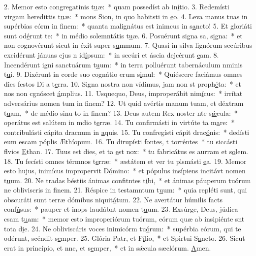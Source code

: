 2. Memor esto congregatinis t\uline{u}æ:~* quam possedíst ab in\uline{í}tio.
3. Redemísti virgam heredittis t\uline{u}æ:~* mons Sion, in quo habitsti in \uline{e}o.
4. Leva manus tuas in supérbias eórm in f\uline{i}nem:~* quanta malignátus est inimcus in s\uline{a}ncto!
5. Et gloriáti sunt  od\uline{é}runt te:~* in médio solemntátis t\uline{u}æ.
6. Posuérunt signa sa, s\uline{i}gna:~* et non cognovérunt sicut in éxit super s\uline{u}mmum.
7. Quasi in silva lignórum secúribus excidérunt jánuas ejus n id\uline{í}psum:~* in secúri et áscia dejcérunt \uline{e}am.
8. Incendérunt igni sanctuárum t\uline{u}um:~* in terra polluérunt tabernáculum nminis t\uline{u}i.
9. Dixérunt in corde suo cognátio erum s\uline{i}mul:~* Quiéscere faciámus omnes dies festos Di a t\uline{e}rra.
10. Signa nostra non vídimus, jam non st proph\uline{é}ta:~* et nos non cgnóscet \uline{á}mplius.
11. Usquequo, Deus, improperábit nim\uline{í}cus:~* irrítat adversárius nomen tum in f\uline{i}nem?
12. Ut quid avértis manum tuam, et déxtram t\uline{u}am,~* de médio sinu to in f\uline{i}nem?
13. Deus autem Rex noster nte s\uline{ǽ}cula:~* operátus est salútem in mdio t\uline{e}rræ.
14. Tu confirmásti in virtúte ta m\uline{a}re:~* contribulásti cápita dracnum in \uline{a}quis.
15. Tu confregísti cápit drac\uline{ó}nis:~* dedísti eum escam póplis Æth\uline{í}opum.
16. Tu dirupísti fontes, t torr\uline{é}ntes~* tu siccásti flvios \uline{E}than.
17. Tuus est dies, et ta \uline{e}st nox:~* tu fabricátus es aurram et s\uline{o}lem.
18. Tu fecísti omnes térmnos t\uline{e}rræ:~* æstátem et ver tu plsmásti \uline{e}a.
19. Memor esto hujus, inimícus impropervit D\uline{ó}mino:~* et pópulus insípiens incitávt nomen t\uline{u}um.
20. Ne tradas béstiis ánimas confitntes t\uline{i}bi,~* et ánimas páuperum tuórum ne obliviscris in f\uline{i}nem.
21. Réspice in testamntum t\uline{u}um:~* quia repléti sunt, qui obscuráti sunt terræ dómibus niquit\uline{á}tum.
22. Ne avertátur húmilis facts conf\uline{ú}sus:~* pauper et inops laudábnt nomen t\uline{u}um.
23. Exsúrge, Deus, júdica csam t\uline{u}am:~* memor esto improperiórum tuórum, eórum quæ ab insipiénte snt tota d\uline{i}e.
24. Ne obliviscáris voces inimicórm tu\uline{ó}rum:~* supérbia eórum, qui te odérunt, scéndit s\uline{e}mper.
25. Glória Patr, et F\uline{í}lio,~* et Spirtui S\uline{a}ncto.
26. Sicut erat in princípio, et nnc, et s\uline{e}mper,~* et in sǽcula sæclórum. \uline{A}men.
